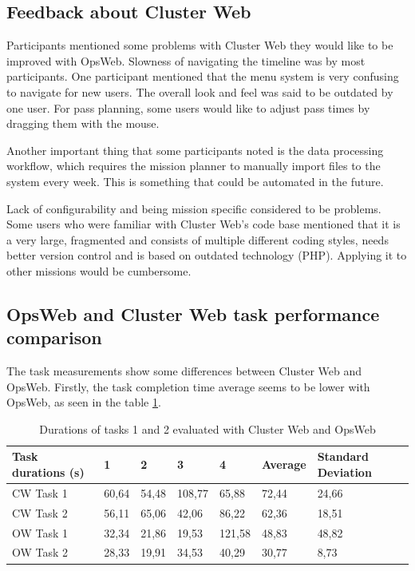 \subsection{Feedback about Cluster Web}
Participants mentioned some problems with Cluster Web they would like to be improved with OpsWeb. Slowness of navigating the timeline was by most participants. One participant mentioned that the menu system is very confusing to navigate for new users. The overall look and feel was said to be outdated by one user. For pass planning, some users would like to adjust pass times by dragging them with the mouse.

Another important thing that some participants noted is the data processing workflow, which requires the mission planner to manually import files to the system every week. This is something that could be automated in the future. 

Lack of configurability and being mission specific considered to be problems. Some users who were familiar with Cluster Web's code base mentioned that it is a very large, fragmented and consists of multiple different coding styles, needs better version control and is based on outdated technology (PHP). Applying it to other missions would be cumbersome.

\subsection{OpsWeb and Cluster Web task performance comparison} \label{cw_ow_task_perf}
The task measurements show some differences between Cluster Web and OpsWeb. Firstly, the task completion time average seems to be lower with OpsWeb, as seen in the table \ref{cw_ow_times}.

\begin{table}[!ht]
\def\arraystretch{1.1}%
    \begin{center}
    \caption{Durations of tasks 1 and 2 evaluated with Cluster Web and OpsWeb}
    \label{cw_ow_times}
    \begin{tabular}{| l | l | l | l | l | l | l | }
    \hline
    Task durations (s) & 1     & 2     & 3      & 4      & Average & Standard Deviation \\
    \hline
    CW Task 1            & 60,64 & 54,48 & 108,77 & 65,88  & 72,44   & 24,66              \\
    CW Task 2            & 56,11 & 65,06 & 42,06  & 86,22  & 62,36   & 18,51              \\
    OW Task 1            & 32,34 & 21,86 & 19,53  & 121,58 & 48,83   & 48,82              \\
    OW Task 2            & 28,33 & 19,91 & 34,53  & 40,29  & 30,77   & 8,73              \\
    \hline
    \end{tabular}
    \end{center}
\end{table}

